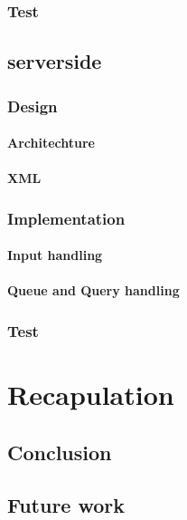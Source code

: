      \subsection{Test}

  \section{serverside} %
    \subsection{Design}
      \subsubsection{Architechture}
      \subsubsection{XML}
    \subsection{Implementation}
      \subsubsection{Input handling}
      \subsubsection{Queue and Query handling}
    \subsection{Test}

\chapter{Recapulation}
  \section{Conclusion}
  \section{Future work}

\appendix


